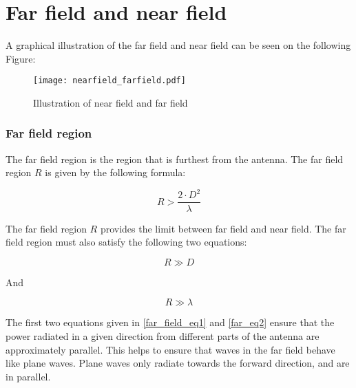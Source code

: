 \chapter{Far field and near field}

A graphical illustration of the far field and near field \citep{farnear_field1}\citep{farnear_field2} can be seen on the following Figure:

\begin{figure}[H]
\centering
\texttt{[image: nearfield\_farfield.pdf]}
\caption{Illustration of near field and far field \citep{farnear_field}}
\label{para_wave}
\end{figure}



\subsection{Far field region}

The far field region is the region that is furthest from the antenna. The far field region $R$ is given by the following formula:

\begin{equation}
R > \frac{2 \cdot D^{2}}{\lambda}
\label{far_field_eq1}
\end{equation}

\begin{where}
\end{where}

The far field region $R$ provides the limit between far field and near field. The far field region must also satisfy the following two equations:

\begin{equation}
R \gg D
\label{far_eq2}
\end{equation}

And

\begin{equation}
R \gg \lambda
\label{far_eq_3}
\end{equation}

The first two equations given in \ref{far_field_eq1} and \ref{far_eq2} ensure that the power radiated in a given direction from different parts of the antenna are approximately parallel. This helps to ensure that waves in the far field behave like plane waves. Plane waves only radiate towards the forward direction, and are in parallel. %

